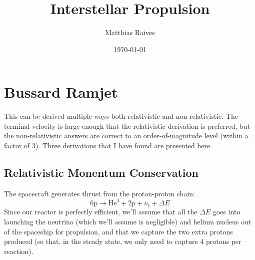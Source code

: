 \documentclass[a4paper]{article}
\title{Interstellar Propulsion}
\author{Matthias Raives}
\date{\today}
\begin{document}
 
  \maketitle
  
  \section{Bussard Ramjet}
    This can be derived multiple ways both relativistic and non-relativistic.  The terminal velocity is large enough that the relativistic derivation is preferred, but the non-relativistic answers are correct to an order-of-magnitude level (within a factor of 3).  Three derivations that I have found are presented here.
    
    \subsection{Relativistic Monentum Conservation}
      The spacecraft generates thrust from the proton-proton chain:
      \begin{equation}
          6\mathrm{p} \rightarrow \mathrm{He}^{4} + 2\mathrm{p} + \nu_{e} + \Delta E
      \end{equation}
      Since our reactor is perfectly efficient, we'll assume that all the $\Delta E$ goes into launching the neutrino (which we'll assume is negligible) and helium nucleus out of the spaceship for propulsion, and that we capture the two extra protons produced (so that, in the steady state, we only need to capture 4 protons per reaction).
      
\end{document}
